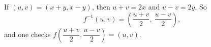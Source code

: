 If $(u,v)=(x+y,x-y)$, then $u+v=2x$ and $u-v=2y$. So
\[
f^{-1}(u,v)=\boxed{\left(\dfrac{u+v}{2},\ \dfrac{u-v}{2}\right)},
\]
and one checks $f\left(\dfrac{u+v}{2},\dfrac{u-v}{2}\right)=(u,v)$.
